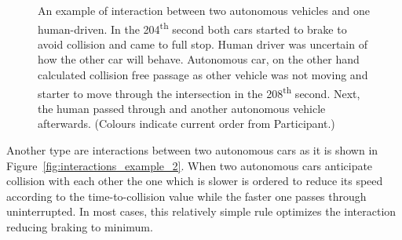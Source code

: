 \documentclass[11pt,english,twoside]{article}
\begin{document}



\begin{figure}[!] %
\caption{An example of interaction between two autonomous vehicles and one human-driven. In the 204\textsuperscript{th} second both cars started to brake to avoid collision and came to full stop. Human driver was uncertain of how the other car will behave. Autonomous car, on the other hand calculated collision free passage as other vehicle was not moving and starter to move through the intersection in the 208\textsuperscript{th} second. Next, the human passed through and another autonomous vehicle afterwards. (Colours indicate current order from Participant.)}
\label{fig:interactions_example_1v2}
\end{figure}

Another type are interactions between two autonomous cars as it is shown in Figure~\ref{fig:interactions_example_2}. When two autonomous cars anticipate collision with each other the one which is slower is ordered to reduce its speed according to the time-to-collision value while the faster one passes through uninterrupted. In most cases, this relatively simple rule optimizes the interaction reducing braking to minimum.  





\end{document}
